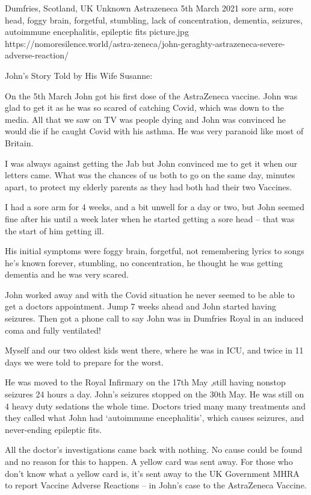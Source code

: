 {Dumfries, Scotland, UK}
{Unknown}
{Astrazeneca}
{5th March 2021}
{sore arm, sore head,  foggy brain, forgetful, stumbling, lack of concentration, dementia, seizures, autoimmune encephalitis, epileptic fits}
{picture.jpg}
{https://nomoresilence.world/astra-zeneca/john-geraghty-astrazeneca-severe-adverse-reaction/}
{

\normalsize

John’s Story Told by His Wife Susanne:

On the 5th March John got his first dose of the AstraZeneca vaccine. John was
glad to get it as he was so scared of catching Covid, which was down to the
media. All that we saw on TV was people dying and John was convinced he would
die if he caught Covid with his asthma. He was very paranoid like most of
Britain.

I was always against getting the Jab but John convinced me to get it when our
letters came. What was the chances of us both to go on the same day, minutes
apart, to protect my elderly parents as they had both had their two Vaccines.

I had a sore arm for 4 weeks, and a bit unwell for a day or two, but John seemed
fine after his until a week later when he started getting a sore head – that was
the start of him getting ill.

His initial symptoms were foggy brain, forgetful, not remembering lyrics to
songs he’s known forever, stumbling, no concentration, he thought he was getting
dementia and he was very scared.

John worked away and with the Covid situation he never seemed to be able to get
a doctors appointment. Jump 7 weeks ahead and John started having seizures. Then
got a phone call to say John was in Dumfries Royal in an induced coma and fully
ventilated!

Myself and our two oldest kids went there, where he was in ICU, and twice in 11
days we were told to prepare for the worst.

He was moved to the Royal Infirmary on the 17th May ,still having nonstop
seizures 24 hours a day. John’s seizures stopped on the 30th May. He was still
on 4 heavy duty sedations the whole time. Doctors tried many many treatments and
they called what John had ‘autoimmune encephalitis’, which causes seizures, and
never-ending epileptic fits.

All the doctor’s investigations came back with nothing. No cause could be found
and no reason for this to happen. A yellow card was sent away. For those who
don’t know what a yellow card is, it’s sent away to the UK Government MHRA to
report Vaccine Adverse Reactions – in John’s case to the AstraZeneca Vaccine.

}
